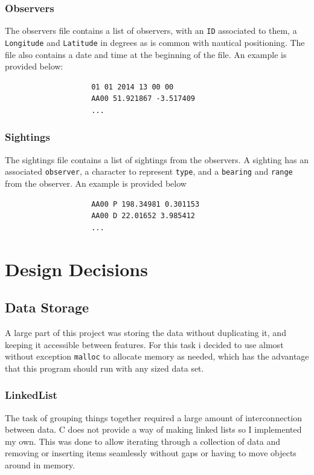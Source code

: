 \documentclass[10pt]{article}
\begin{document}
            \subsubsection{Observers}
                \label{sec:observersFile}
                The observers file contains a list of observers, with an \texttt{ID} associated to them, a \texttt{Longitude} and \texttt{Latitude} in degrees as is common with nautical positioning. The file also contains a date and time at the beginning of the file. An example is provided below:
                \begin{verbatim}
                    01 01 2014 13 00 00
                    AA00 51.921867 -3.517409
                    ...
                \end{verbatim}

            \subsubsection{Sightings}
                \label{sec:sightingsFile}
                The sightings file contains a list of sightings from the observers. A sighting has an associated \texttt{observer}, a character to represent \texttt{type}, and a \texttt{bearing} and \texttt{range} from the observer. An example is provided below
                \begin{verbatim}
                    AA00 P 198.34981 0.301153
                    AA00 D 22.01652 3.985412
                    ...
                \end{verbatim}

    \newpage
    \section{Design Decisions}
        \subsection{Data Storage}
            A large part of this project was storing the data without duplicating it, and keeping it accessible between features. For this task i decided to use almost without exception \texttt{malloc} to allocate memory as needed, which has the advantage that this program should run with any sized data set. 

            \subsubsection{LinkedList}
                The task of grouping things together required a large amount of interconnection between data. C does not provide a way of making linked lists so I implemented my own. This was done to allow iterating through a collection of data and removing or inserting items seamlessly without gaps or having to move objects around in memory.
\end{document}
